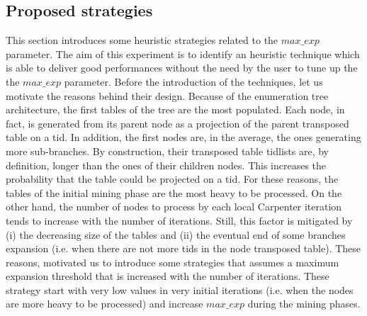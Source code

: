 

\subsection{Proposed strategies}\label{exp_strategies}
This section introduces some heuristic strategies related to the $max\_exp$ parameter. 
The aim of this experiment is to identify an heuristic technique which is able to deliver good performances without the need by the user to tune up the the $max\_exp$ parameter.
Before the introduction of the techniques, let us motivate the reasons behind their design.
Because of the enumeration tree architecture, the first tables of the tree are the most populated. Each node, in fact, is generated from its parent node as a projection of the parent transposed table on a tid. 
In addition, the first nodes are, in the average, the ones generating more sub-branches. By construction, their transposed table tidlists are, by definition, longer than the ones of their children nodes. This increases the probability that the table could be projected on a tid.
For these reasons, the tables of the initial mining phase are the most heavy to be processed.
On the other hand, the number of nodes to process by each local Carpenter iteration tends to increase with the number of iterations. Still, this factor is mitigated by (i) the decreasing size of the tables and (ii) the eventual end of some branches expansion (i.e. when there are not more tids in the node transposed table).
These reasons, motivated us to introduce some strategies that assumes a maximum expansion threshold that is increased with the number of iterations. These strategy start with very low values in very initial iterations  (i.e. when the nodes are more heavy to be processed) and increase $max\_exp$ during the mining phases.

